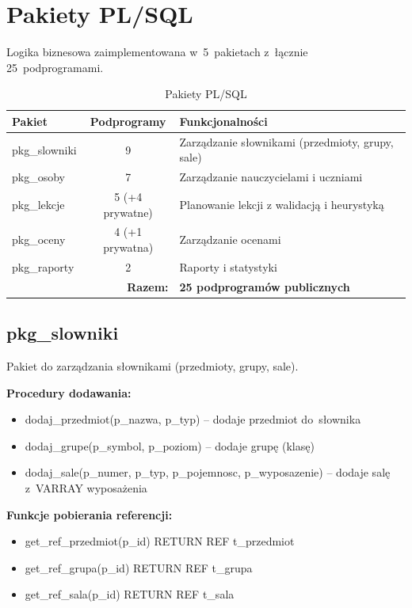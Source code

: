 \documentclass[12pt,a4paper]{article}
\begin{document}
\newpage
\section{Pakiety PL/SQL}

Logika biznesowa zaimplementowana w~5~pakietach z~łącznie 25~podprogramami.

\begin{table}[h]
\centering
\begin{tabular}{|l|c|p{7cm}|}
\hline
\textbf{Pakiet} & \textbf{Podprogramy} & \textbf{Funkcjonalności} \\
\hline
pkg\_slowniki & 9 & Zarządzanie słownikami (przedmioty, grupy, sale) \\
pkg\_osoby & 7 & Zarządzanie nauczycielami i uczniami \\
pkg\_lekcje & 5 (+4 prywatne) & Planowanie lekcji z walidacją i heurystyką \\
pkg\_oceny & 4 (+1 prywatna) & Zarządzanie ocenami \\
pkg\_raporty & 2 & Raporty i statystyki \\
\hline
\multicolumn{2}{|r|}{\textbf{Razem:}} & \textbf{25 podprogramów publicznych} \\
\hline
\end{tabular}
\caption{Pakiety PL/SQL}
\end{table}

\subsection{pkg\_slowniki}

Pakiet do zarządzania słownikami (przedmioty, grupy, sale).

\textbf{Procedury dodawania:}
\begin{itemize}[nosep]
    \item dodaj\_przedmiot(p\_nazwa, p\_typ) -- dodaje przedmiot do~słownika
    \item dodaj\_grupe(p\_symbol, p\_poziom) -- dodaje grupę (klasę)
    \item dodaj\_sale(p\_numer, p\_typ, p\_pojemnosc, p\_wyposazenie) -- dodaje salę z~VARRAY wyposażenia
\end{itemize}

\textbf{Funkcje pobierania referencji:}
\begin{itemize}[nosep]
    \item get\_ref\_przedmiot(p\_id) RETURN REF t\_przedmiot
    \item get\_ref\_grupa(p\_id) RETURN REF t\_grupa
    \item get\_ref\_sala(p\_id) RETURN REF t\_sala
\end{itemize}
\end{document}
